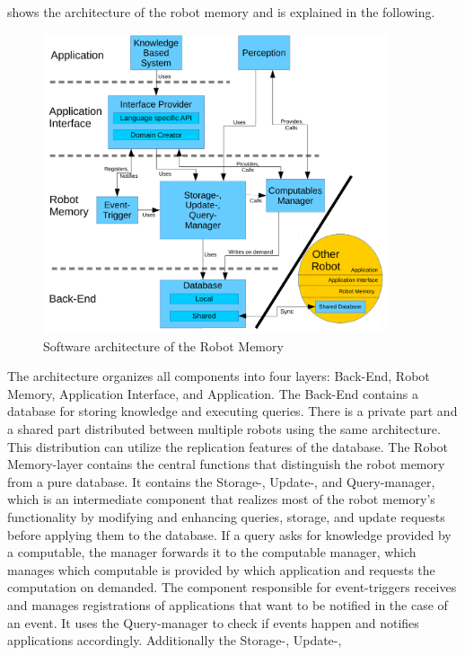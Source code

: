  shows the architecture of the robot
memory and is explained in the following.
\begin{figure}
  \centering
  \includegraphics[width=0.9\textwidth]{architecture.pdf}
  \vspace{-5mm}
  \caption{Software architecture of the Robot Memory}
  \label{fig:arch}
  \vspace{-5mm}
\end{figure}
The architecture organizes all components into four layers: Back-End,
Robot Memory, Application Interface, and Application. The Back-End
contains a database for storing knowledge and executing
queries. There is a private part and a shared part distributed between
multiple robots using the same architecture. This distribution can
utilize the replication features of the database. The Robot
Memory-layer contains the central functions that distinguish the robot
memory from a pure database. It contains the Storage-, Update-, and
Query-manager, which is an intermediate component that realizes most of
the robot memory's functionality by modifying and enhancing queries,
storage, and update requests before applying them to the database. If a
query asks for knowledge provided by a computable, the manager forwards it to the
computable manager, which manages which computable is provided by
which application and requests the computation on demanded. The
component responsible for event-triggers receives and manages
registrations of applications that want to be notified in the case of
an event. It uses the Query-manager to check if events happen and
notifies applications accordingly. Additionally the Storage-, Update-,
